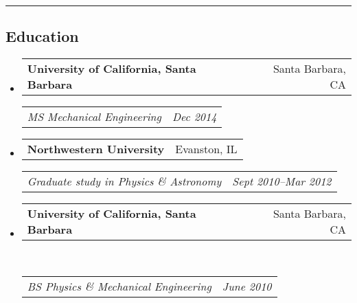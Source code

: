 \documentclass[10pt,letterpaper]{article}
\makeatletter
\newcommand{\headerrow}[2]
{\begin{tabular*}{\linewidth}{l@{\extracolsep{\fill}}r}
	#1 &
	#2 \\
\end{tabular*}}
\makeatother
\begin{document}
\hrule
\vspace{-0.4em}
\subsection*{Education}
\begin{itemize}
	\parskip=-0.1em
	\item 
	\headerrow
		{\textbf{University of California, Santa Barbara}}
		{Santa Barbara, CA}
	\headerrow
		{\emph{MS  Mechanical Engineering}}
		{\emph{Dec 2014}}
	\item 
	\headerrow
		{\textbf{Northwestern University}}
		{Evanston, IL}
	\headerrow
		{\emph{Graduate study in Physics \& Astronomy}}
		{\emph{Sept 2010--Mar 2012}}
	\item 
	\headerrow
		{\textbf{University of California, Santa Barbara}}
		{Santa Barbara, CA}	\\
	\headerrow
		{\emph{BS Physics \&  Mechanical Engineering}}
		{\emph{June 2010}}
\end{itemize}
\end{document}
